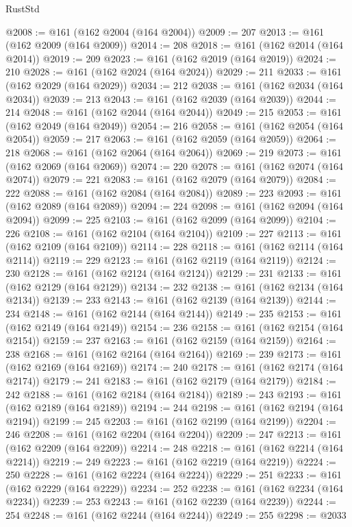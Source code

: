 \begin{lexlean}{RustStd}
\begin{coremodule}
{\begin{coremodule}
{{{{{{{{{{{{{{{{{{{{{{{{{{{{{{{{{{{{{{{{{{{{{{{{{{{{{{{{{{{{@2008 := @161 (@162 @2004 (@164 @2004))
@2009 := 207
@2013 := @161 (@162 @2009 (@164 @2009))
@2014 := 208
@2018 := @161 (@162 @2014 (@164 @2014))
@2019 := 209
@2023 := @161 (@162 @2019 (@164 @2019))
@2024 := 210
@2028 := @161 (@162 @2024 (@164 @2024))
@2029 := 211
@2033 := @161 (@162 @2029 (@164 @2029))
@2034 := 212
@2038 := @161 (@162 @2034 (@164 @2034))
@2039 := 213
@2043 := @161 (@162 @2039 (@164 @2039))
@2044 := 214
@2048 := @161 (@162 @2044 (@164 @2044))
@2049 := 215
@2053 := @161 (@162 @2049 (@164 @2049))
@2054 := 216
@2058 := @161 (@162 @2054 (@164 @2054))
@2059 := 217
@2063 := @161 (@162 @2059 (@164 @2059))
@2064 := 218
@2068 := @161 (@162 @2064 (@164 @2064))
@2069 := 219
@2073 := @161 (@162 @2069 (@164 @2069))
@2074 := 220
@2078 := @161 (@162 @2074 (@164 @2074))
@2079 := 221
@2083 := @161 (@162 @2079 (@164 @2079))
@2084 := 222
@2088 := @161 (@162 @2084 (@164 @2084))
@2089 := 223
@2093 := @161 (@162 @2089 (@164 @2089))
@2094 := 224
@2098 := @161 (@162 @2094 (@164 @2094))
@2099 := 225
@2103 := @161 (@162 @2099 (@164 @2099))
@2104 := 226
@2108 := @161 (@162 @2104 (@164 @2104))
@2109 := 227
@2113 := @161 (@162 @2109 (@164 @2109))
@2114 := 228
@2118 := @161 (@162 @2114 (@164 @2114))
@2119 := 229
@2123 := @161 (@162 @2119 (@164 @2119))
@2124 := 230
@2128 := @161 (@162 @2124 (@164 @2124))
@2129 := 231
@2133 := @161 (@162 @2129 (@164 @2129))
@2134 := 232
@2138 := @161 (@162 @2134 (@164 @2134))
@2139 := 233
@2143 := @161 (@162 @2139 (@164 @2139))
@2144 := 234
@2148 := @161 (@162 @2144 (@164 @2144))
@2149 := 235
@2153 := @161 (@162 @2149 (@164 @2149))
@2154 := 236
@2158 := @161 (@162 @2154 (@164 @2154))
@2159 := 237
@2163 := @161 (@162 @2159 (@164 @2159))
@2164 := 238
@2168 := @161 (@162 @2164 (@164 @2164))
@2169 := 239
@2173 := @161 (@162 @2169 (@164 @2169))
@2174 := 240
@2178 := @161 (@162 @2174 (@164 @2174))
@2179 := 241
@2183 := @161 (@162 @2179 (@164 @2179))
@2184 := 242
@2188 := @161 (@162 @2184 (@164 @2184))
@2189 := 243
@2193 := @161 (@162 @2189 (@164 @2189))
@2194 := 244
@2198 := @161 (@162 @2194 (@164 @2194))
@2199 := 245
@2203 := @161 (@162 @2199 (@164 @2199))
@2204 := 246
@2208 := @161 (@162 @2204 (@164 @2204))
@2209 := 247
@2213 := @161 (@162 @2209 (@164 @2209))
@2214 := 248
@2218 := @161 (@162 @2214 (@164 @2214))
@2219 := 249
@2223 := @161 (@162 @2219 (@164 @2219))
@2224 := 250
@2228 := @161 (@162 @2224 (@164 @2224))
@2229 := 251
@2233 := @161 (@162 @2229 (@164 @2229))
@2234 := 252
@2238 := @161 (@162 @2234 (@164 @2234))
@2239 := 253
@2243 := @161 (@162 @2239 (@164 @2239))
@2244 := 254
@2248 := @161 (@162 @2244 (@164 @2244))
@2249 := 255
@2298 := @2033
}}}}}}}}}}}}}}}}}}}}}}}}}}}}}}}}}}}}}}}}}}}}}}}}}}}}}}}}}}}}
\end{coremodule}}
\end{coremodule}
\end{lexlean}
